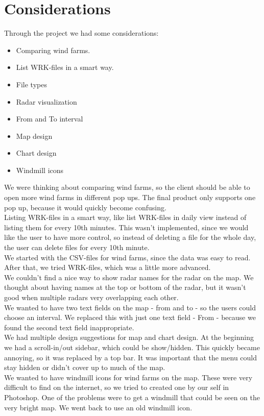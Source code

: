 \chapter{Considerations}
Through the project we had some considerations:
\begin{itemize}
\item Comparing wind farms.
\item List WRK-files in a smart way.
\item File types
\item Radar visualization
\item From and To interval
\item Map design
\item Chart design
\item Windmill icons
\end{itemize}
We were thinking about comparing wind farms, so the client should be able to open more wind farms in different pop ups. The final product only supports one pop up, because it would quickly become confusing.\\
Listing WRK-files in a smart way, like list WRK-files in daily view instead of listing them for every 10th minutes. This wasn't implemented, since we would like the user to have more control, so instead of deleting a file for the whole day, the user can delete files for every 10th minute.\\
We started with the CSV-files for wind farms, since the data was easy to read. After that, we tried WRK-files, which was a little more advanced.\\
We couldn't find a nice way to show radar names for the radar on the map. We thought about having names at the top or bottom of the radar, but it wasn't good when multiple radars very overlapping each other.\\
We wanted to have two text fields on the map - from and to - so the users could choose an interval. We replaced this with just one text field - From - because we found the second text field inappropriate.\\
We had multiple design suggestions for map and chart design. At the beginning we had a scroll-in/out sidebar, which could be show/hidden. This quickly became annoying, so it was replaced by a top bar. It was important that the menu could stay hidden or didn't cover up to much of the map.\\
We wanted to have windmill icons for wind farms on the map. These were very difficult to find on the internet, so we tried to created one by our self in Photoshop. One of the problems were to get a windmill that could be seen on the very bright map. We went back to use an old windmill icon.\\
